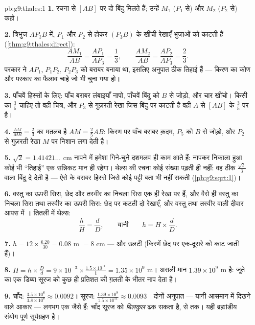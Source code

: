 \begin{solution}{pb:g9:thales:1}
\textbf{1.} रचना से $[AB]$ पर दो बिंदु मिलते हैं; उन्हें $M_1$
($P_1$ से) और $M_2$ ($P_2$ से) कहो।

\textbf{2.} त्रिभुज $A P_3 B$ में, $P_1$ और $P_2$ से होकर
$(P_3 B)$ के  खींची रेखाएँ भुजाओं को  काटती हैं
(\cref{thm:g9:thales:direct}):
\[
\frac{A M_1}{AB} = \frac{A P_1}{A P_3} = \frac13,
\qquad
\frac{A M_2}{AB} = \frac{A P_2}{A P_3} = \frac23 .
\]
परकार ने $A P_1$, $P_1 P_2$, $P_2 P_3$ को बराबर बनाया था, इसलिए
अनुपात ठीक तिहाई हैं --- किरण का कोण और परकार का फैलाव चाहे जो भी
चुना गया हो।

\textbf{3.} पाँचवें हिस्सों के लिए: पाँच बराबर लंबाइयाँ नापो,
पाँचवें बिंदु को $B$ से जोड़ो, और चार  खींचो। किसी
 का $\frac35$ चाहिए तो वही चित्र, और $P_3$ से गुज़रती 
रेखा जिस बिंदु पर काटती है वही $A$ से $[AB]$ के $\frac35$ पर है।

\textbf{4.} $\frac{AM}{MB} = \frac23$ का मतलब है
$AM = \frac25 AB$: किरण पर पाँच बराबर क़दम, $P_5$ को $B$ से जोड़ो,
और $P_2$ से गुज़रती  रेखा $M$ पर निशान लगा देती है।

\textbf{5.} $\sqrt2 = 1.41421\ldots$ cm नापने में हमेशा गिने-चुने
दशमलव ही काम आते हैं: नापकर निकाला हुआ कोई भी ``तिहाई'' एक सन्निकट
मान ही रहेगा। थेल्स की रचना कोई संख्या पढ़ती ही नहीं: वह ठीक
$\frac{\sqrt2}{3}$ वाला बिंदु दे देती है --- ऐसे  के बराबर
हिस्से जिसे कोई पट्टी बता भी नहीं सकती
(\cref{pb:g9:sqrt:1})।

\textbf{6.} वस्तु का ऊपरी सिरा, छेद और तस्वीर का निचला सिरा एक ही
रेखा पर हैं, और वैसे ही वस्तु का निचला सिरा तथा तस्वीर का ऊपरी सिरा:
छेद पर कटती दो रेखाएँ, और वस्तु तथा तस्वीर वाली दीवार आपस में
। तितली में थेल्स:
\[
\frac{h}{H} = \frac{d}{D},
\qquad\text{यानी}\qquad
h = H \times \frac dD .
\]

\textbf{7.} $h = 12 \times \frac{0.20}{30} = 0.08$ m $= 8$ cm ---
और उलटी (किरणें छेद पर एक-दूसरे को काट जाती हैं)।

\textbf{8.} $H = h \times \frac Dd = 9 \times 10^{-3} \times
\frac{1.5 \times 10^{11}}{1} = 1.35 \times 10^{9}$ m। असली मान
$1.39 \times 10^9$ m है: जूते का एक डिब्बा सूरज को कुछ ही प्रतिशत की
ग़लती के भीतर नाप देता है।

\textbf{9.} चाँद: $\frac{3.5 \times 10^6}{3.8 \times 10^8}
\approx 0.0092$। सूरज: $\frac{1.39 \times 10^9}{1.5 \times
10^{11}} \approx 0.0093$। दोनों अनुपात --- यानी आसमान में दिखने वाले
आकार --- लगभग एक जैसे हैं: चाँद सूरज को \emph{बिलकुल} ढक सकता है,
 से  तक। यही ब्रह्मांडीय संयोग पूर्ण सूर्यग्रहण है।


\end{solution}
